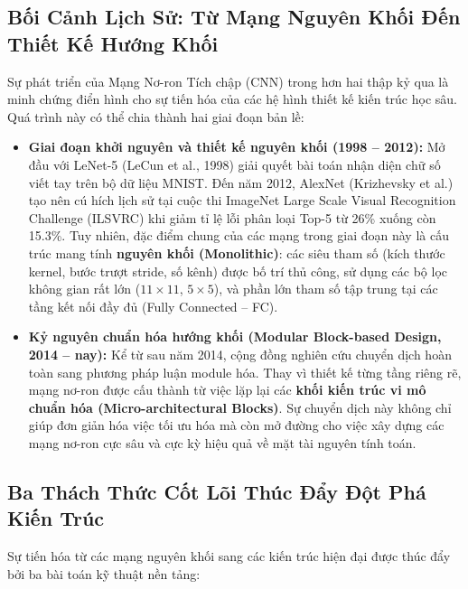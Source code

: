 \documentclass[12pt,a4paper]{report}
\begin{document}
\subsection{Bối Cảnh Lịch Sử: Từ Mạng Nguyên Khối Đến Thiết Kế Hướng Khối}
Sự phát triển của Mạng Nơ-ron Tích chập (CNN) trong hơn hai thập kỷ qua là minh chứng điển hình cho sự tiến hóa của các hệ hình thiết kế kiến trúc học sâu. Quá trình này có thể chia thành hai giai đoạn bản lề:
\begin{itemize}[leftmargin=2em]
    \item \textbf{Giai đoạn khởi nguyên và thiết kế nguyên khối (1998 -- 2012):} Mở đầu với LeNet-5 (LeCun et al., 1998) giải quyết bài toán nhận diện chữ số viết tay trên bộ dữ liệu MNIST. Đến năm 2012, AlexNet (Krizhevsky et al.) tạo nên cú hích lịch sử tại cuộc thi ImageNet Large Scale Visual Recognition Challenge (ILSVRC) khi giảm tỉ lệ lỗi phân loại Top-5 từ 26\% xuống còn 15.3\%. Tuy nhiên, đặc điểm chung của các mạng trong giai đoạn này là cấu trúc mang tính \textbf{nguyên khối (Monolithic)}: các siêu tham số (kích thước kernel, bước trượt stride, số kênh) được bố trí thủ công, sử dụng các bộ lọc không gian rất lớn ($11 \times 11$, $5 \times 5$), và phần lớn tham số tập trung tại các tầng kết nối đầy đủ (Fully Connected -- FC).
    \item \textbf{Kỷ nguyên chuẩn hóa hướng khối (Modular Block-based Design, 2014 -- nay):} Kể từ sau năm 2014, cộng đồng nghiên cứu chuyển dịch hoàn toàn sang phương pháp luận module hóa. Thay vì thiết kế từng tầng riêng rẽ, mạng nơ-ron được cấu thành từ việc lặp lại các \textbf{khối kiến trúc vi mô chuẩn hóa (Micro-architectural Blocks)}. Sự chuyển dịch này không chỉ giúp đơn giản hóa việc tối ưu hóa mà còn mở đường cho việc xây dựng các mạng nơ-ron cực sâu và cực kỳ hiệu quả về mặt tài nguyên tính toán.
\end{itemize}

\subsection{Ba Thách Thức Cốt Lõi Thúc Đẩy Đột Phá Kiến Trúc}
Sự tiến hóa từ các mạng nguyên khối sang các kiến trúc hiện đại được thúc đẩy bởi ba bài toán kỹ thuật nền tảng:
\end{document}
